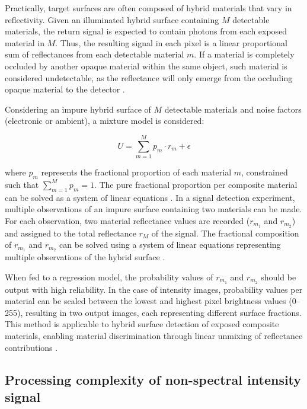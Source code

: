 \documentclass[12pt,a4paper,oneside]{report}
\begin{document}
Practically, target surfaces are often composed of hybrid materials that vary in reflectivity. Given an illuminated hybrid surface containing $M$ detectable materials, the return signal is expected to contain photons from each exposed material in $M$. Thus, the resulting signal in each pixel is a linear proportional sum of reflectances from each detectable material $m$. If a material is completely occluded by another opaque material within the same object, such material is considered undetectable, as the reflectance will only emerge from the occluding opaque material to the detector \cite{heinz2001,schott2007}.

Considering an impure hybrid surface of $M$ detectable materials and noise factors (electronic or ambient), a mixture model is considered:

\begin{equation}
U = \sum_{m=1}^{M} p_m \cdot r_m + \epsilon
\label{eq:3_2}
\end{equation}

where $p_m$ represents the fractional proportion of each material $m$, constrained such that $\sum_{m=1}^{M} p_m = 1$. The pure fractional proportion per composite material can be solved as a system of linear equations \cite{heinz2001}. In a signal detection experiment, multiple observations of an impure surface containing two materials can be made. For each observation, two material reflectance values are recorded ($r_{m_1}$ and $r_{m_2}$) and assigned to the total reflectance $r_M$ of the signal. The fractional composition of $r_{m_1}$ and $r_{m_2}$ can be solved using a system of linear equations representing multiple observations of the hybrid surface \cite{heinz2001,schott2007}.

When fed to a regression model, the probability values of $r_{m_1}$ and $r_{m_2}$ should be output with high reliability. In the case of intensity images, probability values per material can be scaled between the lowest and highest pixel brightness values (0--255), resulting in two output images, each representing different surface fractions. This method is applicable to hybrid surface detection of exposed composite materials, enabling material discrimination through linear unmixing of reflectance contributions \cite{heinz2001,schott2007,elachi2021}.


\subsection{Processing complexity of non-spectral intensity signal}
\label{subsec:processing_complexity_spectral_intensity}
\end{document}
